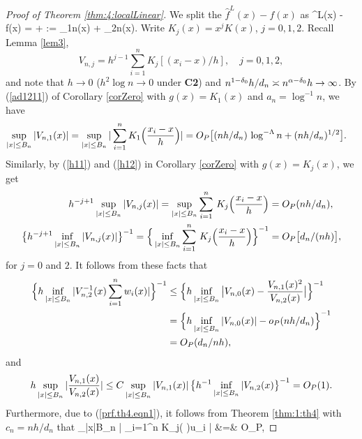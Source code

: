 \begin{proof}[Proof of Theorem \ref {thm:4:localLinear}]  We split the $\widehat{f}^L(x)-f(x)$ as
\be
{}^L(x) - f(x) =  +  := \Gamma_{1n}(x)  + \Gamma_{2n}(x). 
\ee
Write $K_j(x) = x^jK(x)$, $j = 0, 1, 2$. Recall Lemma \ref {lem3}, $$V_{n,j}=h^{j-1}
\sum_{i=1}^nK_j[(x_i-x)/h],\quad  j=0,1,2,$$
 and note that   $h\to 0$ ($h^2\log n\to 0$ under {\bf C2}) and $n^{1 - \delta_0} h / d_n \asymp n^{\alpha - \delta_0 } h \to \infty$.
  By (\ref{ad1211}) of Corollary \ref{corZero} with $g(x) = K_1(x)$ and $a_n = \log^{-1}n$, we have
\begin{align}
\sup_{|x| \le B_n} |V_{n,1}(x)| &= \sup_{|x| \le B_n} |\sum_{i = 1}^n K_1 \Big (\frac{x_i - x}{h} \Big )   |  = O_P\big [(nh / d_n)\, \log^{-\Lambda}n + (nh / d_n)^{1/2} \big ]. \nonumber
\end{align}
Similarly, by (\ref{h11}) and (\ref{h12}) in Corollary \ref{corZero} with $g(x) = K_j(x)$, we get
\begin{align}
 h^{-j + 1}\sup_{|x| \le B_n} |V_{n,j}(x)|  =\sup_{|x|\le B_n} \sum_{i=1}^{n}\, K_j\Big (\frac{x_{i}-x}{h}\Big) &= O_P(nh/ d_n), \la{prf.th4.eqn1}\\
\big \{ h^{-j + 1}\inf_{|x| \le B_n} |V_{n,j}(x)| \big \}^{-1} =\Big \{\inf_{|x|\le B_n} \sum_{i=1}^{n}\, K_j\Big (\frac{x_{i}-x}{h}\Big )\Big \}^{-1} &= O_P\big[ d_n / (nh) \big],\la{prf.th4.eqn2}
\end{align}
for $j = 0$ and $ 2$. It follows from these facts  that
\begin{align}
\Big\{h\inf_{|x| \le B_n} | V^{-1}_{n, 2}(x) \sum_{i = 1}^n w_i(x) |\Big\}^{-1} &\le \Big\{h \inf_{|x| \le B_n}  \big |V_{n, 0}(x) - \frac{V_{n, 1}(x)^2}{V_{n,2}(x)} \big | \Big\}^{-1} \no\\
&= \Big\{ h \inf_{|x| \le B_n}  |V_{n, 0}(x)| - o_P(nh/d_n) \Big\}^{-1} \no\\
&= O_P (d_n/nh),\la{prf.th4.eqn3}
\end{align}
and
\begin{align}
h\sup_{|x| \le B_n} | \frac{ V_{n, 1}(x)}{V_{n,2}(x)}|\le C \sup_{|x| \le B_n}|V_{n, 1}(x)| \,\big \{h^{-1} \inf_{|x|\le B_n}|V_{n, 2}(x) \big \}^{-1} = O_P(1).\la{prf.th4.eqn4}
\end{align}
Furthermore, due to (\ref{prf.th4.eqn1}), it follows from Theorem \ref{thm:1:th4} with $c_n=nh/ d_n$ that
\be
\sup_{|x|\le B_n} \Big | \sum_{i=1}^n K_j\Big ( \Big )u_i \Big | &=& O_P,

\end{proof}
